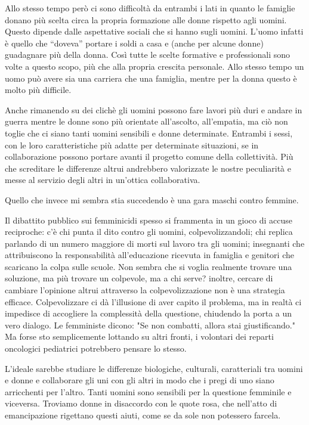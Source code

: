 \documentclass[12pt]{book} %
\begin{document}
Allo stesso tempo però ci sono difficoltà da entrambi i lati in quanto le famiglie donano più scelta circa la propria
formazione alle donne rispetto agli uomini. Questo dipende dalle aspettative sociali che si hanno sugli uomini.
L'uomo infatti è quello che “doveva” portare i soldi a casa e (anche per alcune donne) guadagnare
più della donna. Così tutte le scelte formative e professionali sono volte a questo scopo, più che alla
propria crescita personale.
Allo stesso tempo un uomo può avere sia una carriera che una famiglia, mentre per la donna questo è molto più difficile.





Anche rimanendo su dei clichè gli uomini possono fare lavori più duri e andare in guerra mentre le donne sono più
orientate all'ascolto, all'empatia, ma ciò non toglie che ci siano tanti
uomini sensibili e donne determinate. Entrambi i sessi, con le loro caratteristiche più adatte per determinate
situazioni, se in collaborazione possono portare avanti il progetto comune della collettività.
Più che screditare le differenze altrui andrebbero valorizzate le nostre peculiarità e messe al servizio degli altri in un'ottica collaborativa.

Quello che invece mi sembra stia succedendo è una gara maschi contro femmine.

Il dibattito pubblico sui femminicidi spesso si frammenta in un gioco di accuse reciproche: c'è chi punta il dito contro gli uomini, colpevolizzandoli; chi replica parlando di un numero maggiore di morti sul lavoro tra gli uomini; insegnanti che attribuiscono la responsabilità all’educazione ricevuta in famiglia e genitori che scaricano la colpa sulle scuole. Non sembra che si voglia realmente trovare una soluzione, ma più trovare un colpevole, ma a chi serve? inoltre, cercare di cambiare l'opinione altrui attraverso la colpevolizzazione non è una strategia efficace. Colpevolizzare ci dà l'illusione di aver capito il problema, ma in realtà ci impedisce di accogliere la complessità della questione, chiudendo la porta a un vero dialogo. Le femministe dicono: "Se non combatti, allora stai giustificando." Ma forse sto semplicemente lottando su altri fronti, i volontari dei reparti oncologici pediatrici potrebbero pensare lo stesso.

L'ideale sarebbe studiare le differenze biologiche, culturali, caratteriali tra uomini e
donne e collaborare gli uni con gli altri in modo che i pregi di uno siano arricchenti per
l'altro. Tanti uomini sono sensibili per la questione femminile e viceversa. Troviamo donne in
disaccordo con le quote rosa, che nell'atto di emancipazione rigettano questi aiuti, come se da
sole non potessero farcela.
\end{document}

